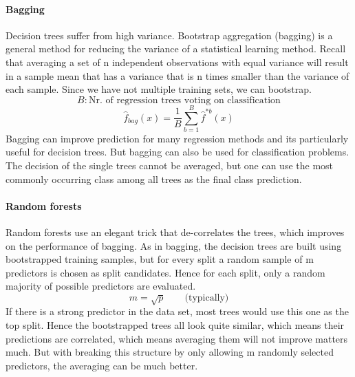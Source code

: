 \documentclass[../document.tex]{subfiles}
\begin{document}
	\paragraph{Bagging}
	Decision trees suffer from high variance. Bootstrap aggregation (bagging) is a general method for reducing the variance of a statistical learning method. Recall that averaging a set of n independent observations with equal variance will result in a sample mean that has a variance that is n times smaller than the variance of each sample.
	Since we have not multiple training sets, we can bootstrap.
	\begin{equation*}
		B: \text{Nr. of regression trees voting on classification}
	\end{equation*}
	\begin{equation}
		\hat{f}_{bag}(x)=\frac{1}{B}\sum_{b=1}^{B}\hat{f}^{*b}(x)
	\end{equation}
	Bagging can improve prediction for many regression methods and its particularly useful for decision trees. But bagging can also be used for classification problems. The decision of the single trees cannot be averaged, but one can use the most commonly occurring class among all trees as the final class prediction.

	\paragraph{Random forests}
	Random forests use an elegant trick that de-correlates the trees, which improves on the performance of bagging. As in bagging, the decision trees are built using bootstrapped training samples, but for every split a random sample of m predictors is chosen as split candidates. Hence for each split, only a random majority of possible predictors are evaluated.\
	\begin{equation}
		m=\sqrt{p} \qquad \text{(typically)}
	\end{equation}
	If there is a strong predictor in the data set, most trees would use this one as the top split. Hence the bootstrapped trees all look quite similar, which means their predictions are correlated, which means averaging them will not improve matters much. But with breaking this structure by only allowing m randomly selected predictors, the averaging can be much better.
\end{document}
